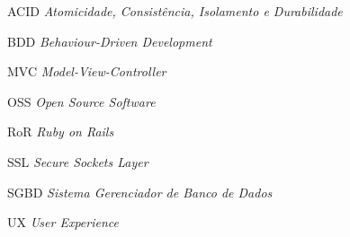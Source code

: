\begin{siglas}
\item[ACID] \textit{Atomicidade, Consistência, Isolamento e Durabilidade}
\item[BDD] \textit{Behaviour-Driven Development}
\item[MVC] \textit{Model-View-Controller}
\item[OSS] \textit{Open Source Software}
\item[RoR] \textit{Ruby on Rails}
\item[SSL] \textit{Secure Sockets Layer}
\item[SGBD] \textit{Sistema Gerenciador de Banco de Dados}
\item[UX] \textit{User Experience}
\end{siglas}





